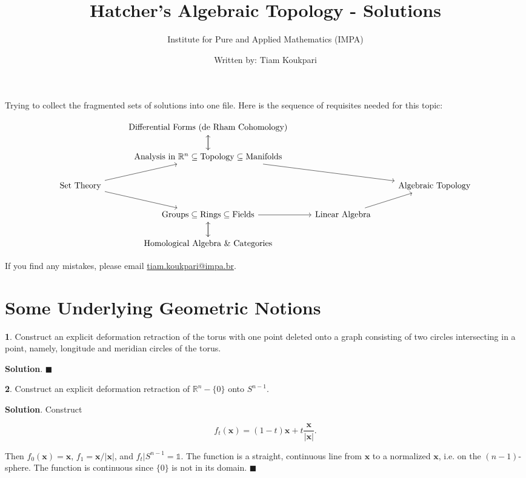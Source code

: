 \documentclass{article}
\title{Hatcher's Algebraic Topology - Solutions}
\author{Institute for Pure and Applied Mathematics (IMPA)}
\date{Written by: Tiam Koukpari}
\newcommand{\R}{\mathbb{R}}
\newcommand{\identity}{\mathds{1}}
\begin{document}
\maketitle

Trying to collect the fragmented sets of solutions into one file. Here is the sequence of requisites needed for this topic:
\bigskip

\[\begin{tikzcd}
& \textnormal{Differential Forms (de Rham Cohomology)} \arrow[d] & \\
& \textnormal{Analysis in } \R^{n} \subseteq \textnormal{Topology} \subseteq \textnormal{Manifolds} \arrow[rrd] \arrow[u] & \\
\textnormal{Set Theory} \arrow[ru] \arrow[rd] & & & \textnormal{Algebraic Topology} \\
& \textnormal{Groups} \subseteq \textnormal{Rings} \subseteq \textnormal{Fields} \arrow[r]\arrow[d] & \textnormal{Linear Algebra} \arrow[ru] & \\
& \textnormal{Homological Algebra \& Categories} \arrow[u]
\end{tikzcd}\]
\bigskip
\bigskip

If you find any mistakes, please email \href{mailto:tiam.koukpari@impa.br}{tiam.koukpari@impa.br}.
\newpage

\tableofcontents
\newpage

\section{Some Underlying Geometric Notions}

\tab\textbf{1}. Construct an explicit deformation retraction of the torus with one point deleted onto a graph consisting of two circles intersecting in a point, namely, longitude and meridian circles of the torus.
\medskip

\textbf{Solution}. $\blacksquare$
\bigskip
\bigskip

\textbf{2}. Construct an explicit deformation retraction of $\R^{n} - \{0\}$ onto $S^{n-1}$.
\medskip

\textbf{Solution}. Construct

$$f_{t}(\mathbf{x}) = (1-t)\mathbf{x} + t\frac{\mathbf{x}}{|\mathbf{x}|}.$$

Then $f_{0}(\mathbf{x}) = \mathbf{x}$, $f_{1} = \mathbf{x}/|\mathbf{x}|$, and $f_{t}|S^{n-1} = \identity$. The function is a straight, continuous line from $\mathbf{x}$ to a normalized $\mathbf{x}$, i.e. on the $(n-1)$-sphere. The function is continuous since $\{0\}$ is not in its domain. $\blacksquare$
\bigskip
\bigskip
\end{document}
